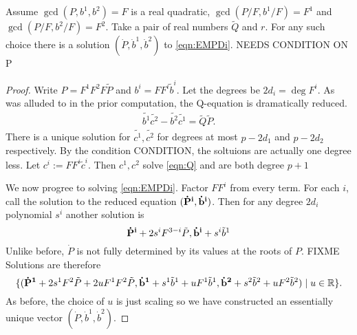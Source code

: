 \begin{lem}
Assume $\gcd(P,b^1,b^2) = F$ is a real quadratic, $\gcd(P/F,b^1/F)=F^1$ and $\gcd(P/F,b^2/F)=F^2$. Take a pair of real numbers $\tilde Q$ and $r$. For any such choice there is a solution $(\dot P, \dot b^1, \dot b^2)$ to \eqref{eqn:EMPDi}. NEEDS CONDITION ON P 
\begin{proof}

Write $P = F^1F^2F\tilde{P}$ and $b^i = FF^i\tilde b^i$. Let the degrees be $2d_i = \deg F^i$. As was alluded to in the prior computation, the Q-equation is dramatically reduced.
\begin{align}
\tilde{b^1}\tilde{c^2} - \tilde{b^2}\tilde{c^1} = \tilde{Q}\tilde{P}.
\end{align}
There is a unique solution for $\tilde{c^1},\tilde{c^2}$ for degrees at most $p-2d_1$ and $p-2d_2$ respectively. By the condition CONDITION, the soltuions are actually one degree less. Let $c^i :=  FF^i\tilde{c}^i$. Then $c^1, c^2$ solve \eqref{eqn:Q} and are both degree $p+1$

We now progree to solving \eqref{eqn:EMPDi}. Factor $FF^i$ from every term. For each $i$, call the solution to the reduced equation $({\bf\dot P^i}, {\bf\dot b^i})$. Then for any degree $2d_i$ polynomial $s^i$ another solution is
\[
{\bf\dot P^i} + 2s^i F^{3-i}\tilde P, {\bf\dot b^i} + s^i \tilde b^1
\]
Unlike before, $\dot P$ is not fully determined by its values at the roots of $P$. FIXME  Solutions are therefore
\[
\{ ({\bf \dot P^1} + 2s^1 F^2 \tilde{P} + 2u F^1F^2\tilde{P}, {\bf \dot b^1} + s^1\tilde{b}^1 + u F^1\tilde{b}^1, {\bf \dot b^2} + s^2\tilde{b}^2 + uF^2 \tilde{b}^2) \mid u \in \mathbb{R}\}.
\]
As before, the choice of $u$ is just scaling so we have constructed an essentially unique vector $(\dot P, \dot b^1, \dot b^2)$.
\end{proof}
\end{lem}












